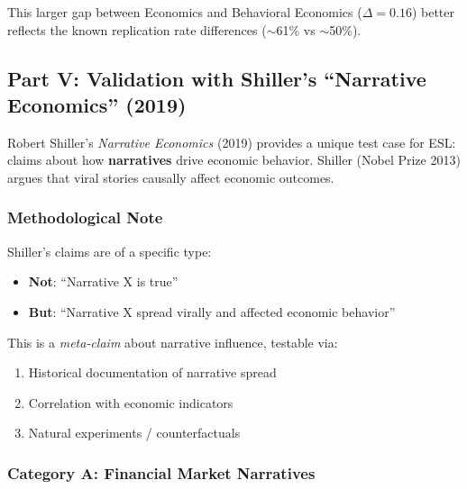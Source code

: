 \documentclass[11pt,a4paper]{article}
\begin{document}
This larger gap between Economics and Behavioral Economics ($\Delta = 0.16$) better reflects the known replication rate differences ($\sim$61\% vs $\sim$50\%).


\subsection{Part V: Validation with Shiller's ``Narrative Economics'' (2019)}

Robert Shiller's \textit{Narrative Economics} (2019) provides a unique test case for ESL: claims about how \textbf{narratives} drive economic behavior. Shiller (Nobel Prize 2013) argues that viral stories causally affect economic outcomes.

\subsubsection{Methodological Note}

Shiller's claims are of a specific type:
\begin{itemize}
    \item \textbf{Not}: ``Narrative X is true''
    \item \textbf{But}: ``Narrative X spread virally and affected economic behavior''
\end{itemize}

This is a \textit{meta-claim} about narrative influence, testable via:
\begin{enumerate}
    \item Historical documentation of narrative spread
    \item Correlation with economic indicators
    \item Natural experiments / counterfactuals
\end{enumerate}

\subsubsection{Category A: Financial Market Narratives}
\end{document}
